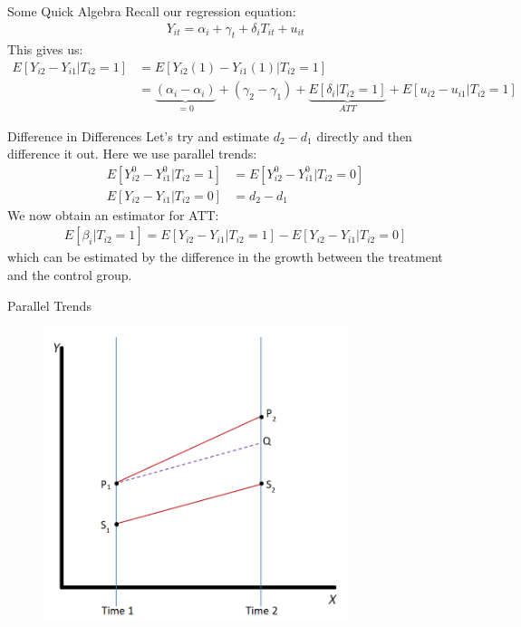 \documentclass[xcolor=pdftex,dvipsnames,table,mathserif,aspectratio=169]{beamer}
\begin{document}
\begin{frame}{Some Quick Algebra}
Recall our regression equation:
\begin{align*}
 Y_{it} =\alpha_i +\gamma_t +\delta_i T_{it}  + u_{it}
 \end{align*}
 This gives us:
\begin{align*}
E[Y_{i2} - Y_{i1} | T_{i2}=1] 
& = E[Y_{i2}(1) - Y_{i1}(1) | T_{i2}=1] \\
&= \underbrace{(\alpha_i - \alpha_i)}_{=0} + (\gamma_2-\gamma_1) + \underbrace{E[\delta_i  | T_{i2}=1]}_{ATT}  +  E[u_{i2} - u_{i1}  | T_{i2}=1] 
\end{align*}
\end{frame}






\begin{frame}{Difference in Differences} 
Let's try and estimate $d_2- d_1$ directly and then difference it out. Here we use \alert{parallel trends}:
\begin{align*}
E[Y_{i2}^0 - Y_{i1}^0 | T_{i2}=1]  &= E[Y_{i2}^0 - Y_{i1}^0 | T_{i2}=0] \\
E[Y_{i2} - Y_{i1} | T_{i2}=0] & = d_2-d_1
\end{align*}
We now obtain an estimator for ATT:
\begin{align*}
E[\beta_{i}| T_{i2}=1]  = E[Y_{i2} - Y_{i1} | T_{i2}=1] - E[Y_{i2} - Y_{i1} | T_{i2}=0]  
\end{align*}
which can be estimated by the difference in the growth between the treatment and the control group.
\end{frame}

\begin{frame}{Parallel Trends}
\begin{figure}
\centering
\includegraphics[width=3.5in]{./resources/parallel-trends}
\end{figure}
\end{frame}
\end{document}
